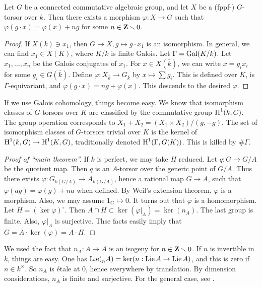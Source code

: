 \begin{prop}
Let $G$ be a connected commutative algebraic group, and let $X$ be a (fppf-) 
$G$-torsor over $k$. Then there exists a morphism 
$\varphi:X\to G$ such that $\varphi(g\cdot x)=\varphi(x)+n g$ for some 
$n\in \mathbf{Z}\smallsetminus 0$. 
\end{prop}
\begin{proof}
If $X(k) \ni x_1$, then $G\to X,g\mapsto g\cdot x_1$ is an isomorphism. In 
general, we can find $x_1\in X(K)$, where $K/k$ is finite Galois. Let 
$\Gamma=\operatorname{Gal}(K/k)$. Let $x_1,\dots,x_n$ be the Galois conjugates of $x_1$. 
For $x\in X(\bar k)$, we can write $x=g_i x_i$ for some $g_i\in G(\bar k)$. 
Define $\varphi:X_{\bar k} \to G_{\bar k}$ by $x\mapsto \sum g_i$. This is 
defined over $K$, is $\Gamma$-equivariant, and 
$\varphi(g\cdot x)=n g+ \varphi(x)$. This descends to the desired $\varphi$. 
\end{proof}

If we use Galois cohomology, things become easy. We know that isomorphism 
classes of $G$-torsors over $K$ are classified by the commutative group 
$\operatorname{H}^1(k,G)$. The group operation corresponds to 
$X_1+X_2 = (X_1\times X_2)/(g,-g)$. The set of isomorphism classes of 
$G$-torsors trivial over $K$ is the kernel of 
$\operatorname{H}^1(k,G) \to \operatorname{H}^1(K,G)$, traditionally denoted $\operatorname{H}^1(\Gamma,G(K))$. This is 
killed by $\# \Gamma$. 

\begin{proof}[Proof of ``main theorem'']
If $k$ is perfect, we may take $H$ reduced. Let $q:G\to G/A$ be the quotient 
map. Then $q$ is an $A$-torsor over the generic point of $G/A$. Thus there 
exists $\varphi:G_{k(G/A)} \to A_{k(G/A)}$, hence a rational map 
$G\to A$, such that $\varphi(a g)=\varphi(g)+n a$ when defined. By Weil's 
extension theorem, $\varphi$ is a morphism. Also, we may assume $1_G \mapsto 0$. 
It turns out that $\varphi$ is a homomorphism. Let $H=(\ker\varphi)^\circ$. Then 
$A\cap H\subset \ker(\varphi|_A) = \ker(n_A)$. The last group is finite. 
Also, $\varphi|_A$ is surjective. Thse facts easily imply that 
$G=A\cdot \ker(\varphi) = A\cdot H$. 
\end{proof}

We used the fact that $n_A:A\to A$ is an isogeny for $n\in \mathbf{Z}\smallsetminus 0$. 
If $n$ is invertible in $k$, things are easy. One has 
$\operatorname{Lie}(\prescript{}{n}{A}) = \ker(n:\operatorname{Lie} A\to \operatorname{Lie} A)$, and this is zero if 
$n\in k^\times$. So $n_A$ is \'etale at $0$, hence everywhere by translation. 
By dimension considerations, $n_A$ is finite and surjective. For the general 
case, see \cite{m08}. 

